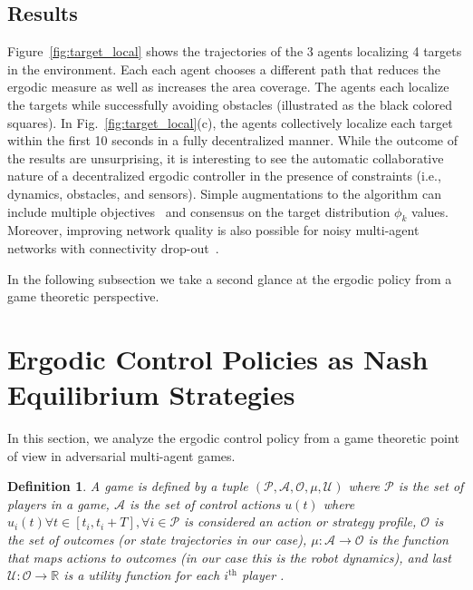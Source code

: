 \documentclass[letterpaper, 10 pt, conference]{ieeeconf}  %
\newtheorem{definition}{Definition}
\begin{document}
\subsection{Results}
Figure~\ref{fig:target_local} shows the trajectories of the 3 agents localizing 4 targets in the environment. 
Each each agent chooses a different path that reduces the ergodic measure as well as increases the area coverage.
The agents each localize the targets while successfully avoiding obstacles (illustrated as the black colored squares).
In Fig.~\ref{fig:target_local}(c), the agents collectively localize each target within the first 10 seconds in a fully decentralized manner.
While the outcome of the results are unsurprising, it is interesting to see the automatic collaborative nature of a decentralized ergodic controller in the presence of constraints (i.e., dynamics, obstacles, and sensors).
Simple augmentations to the algorithm can include multiple objectives~\cite{cho2017survey,moritz2017heterogeneous} and consensus on the target distribution $\phi_k$ values.
Moreover, improving network quality is also possible for noisy multi-agent networks with connectivity drop-out~\cite{satici2016global}.

In the following subsection we take a second glance at the ergodic policy from a game theoretic perspective.

\section{Ergodic Control Policies as Nash Equilibrium Strategies}
\label{sec:ergodic-control-policies-as-nash-equilibrium-strategies}
In this section, we analyze the ergodic control policy from a game theoretic point of view in adversarial multi-agent games.
\begin{definition}
A game is defined by a tuple $(\mathcal{P}, \mathcal{A}, \mathcal{O}, \mu, \mathcal{U})$ where $\mathcal{P}$ is the set of players in a game, $\mathcal{A}$ is the set of control actions $u(t)$ where $u_i(t) \forall t \in \left[ t_i, t_i + T \right], \forall i \in \mathcal{P}$ is considered an action or strategy profile, $\mathcal{O}$ is the set of outcomes (or state trajectories in our case), $\mu : \mathcal{A} \to \mathcal{O}$ is the function that maps actions to outcomes (in our case this is the robot dynamics), and last $\mathcal{U} : \mathcal{O} \to \mathbb{R}$ is a utility function  for each $i^\text{th}$ player .
\end{definition}
\end{document}

